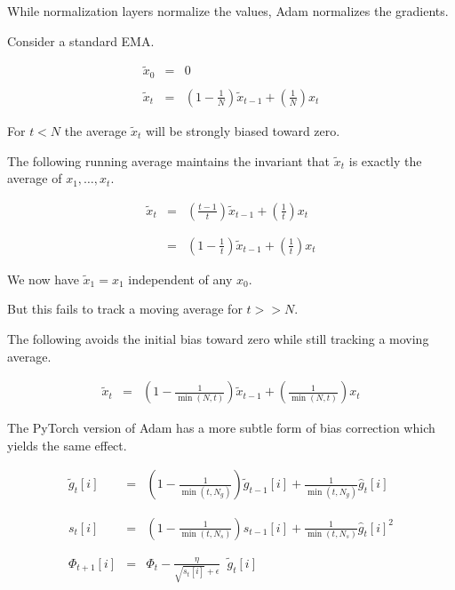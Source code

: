 {\vfill
While normalization layers normalize the values, Adam normalizes the gradients.


Consider a standard EMA.

\begin{eqnarray*}
\tilde{x}_0 & = & 0 \\
\\
\tilde{x}_t & = & \left(1-\frac{1}{N}\right)\tilde{x}_{t-1} + \left(\frac{1}{N}\right)x_t
\end{eqnarray*}

\vfill
For $t < N$ the average $\tilde{x}_t$ will be strongly biased toward zero.


The following running average maintains the invariant that $\tilde{x}_t$ is exactly the average of $x_1,\ldots,x_t$.

\begin{eqnarray*}
\tilde{x}_t & = & \left(\frac{t-1}{t}\right)\tilde{x}_{t-1} + \left(\frac{1}{t}\right)x_t \\
\\
\\
& = & \left(1-\frac{1}{t}\right)\tilde{x}_{t-1} + \left(\frac{1}{t}\right)x_t
\end{eqnarray*}

\vfill
We now have $\tilde{x}_1 = x_1$ independent of any $x_0$.

\vfill
But this fails to track a moving average for $t >> N$.


The following avoids the initial bias toward zero while still tracking a moving average.

\begin{eqnarray*}
\tilde{x}_t & = & \left(1-\frac{1}{\min(N,t)}\right)\tilde{x}_{t-1} + \left(\frac{1}{\min(N,t)}\right)x_t
\end{eqnarray*}

\vfill
The PyTorch version of Adam has a more subtle form of bias correction which yields the same effect.


\begin{eqnarray*}
  \tilde{g}_{t}[i] & = & \left(1-\frac{1}{\min(t,N_g)}\right)\tilde{g}_{t-1}[i] + \frac{1}{\min(t,N_g)} \hat{g}_t[i] \\
  \\
  \\
  s_{t}[i] & = & \left(1-\frac{1}{\min(t,N_s)}\right)s_{t-1}[i] + \frac{1}{\min(t,N_s)} \hat{g}_t[i]^2 \\
  \\
  \\
\Phi_{t+1}[i] & =  & \Phi_t - \frac{\eta}{\sqrt{s_{t}[i]} + \epsilon}\;\;\tilde{g}_{t}[i]
\end{eqnarray*}

}
